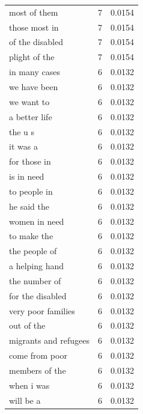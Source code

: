 \begin{tabular}{lrl}
most of them & 7 & 0.0154 \\
those most in & 7 & 0.0154 \\
of the disabled & 7 & 0.0154 \\
plight of the & 7 & 0.0154 \\
in many cases & 6 & 0.0132 \\
we have been & 6 & 0.0132 \\
we want to & 6 & 0.0132 \\
a better life & 6 & 0.0132 \\
the u s & 6 & 0.0132 \\
it was a & 6 & 0.0132 \\
for those in & 6 & 0.0132 \\
is in need & 6 & 0.0132 \\
to people in & 6 & 0.0132 \\
he said the & 6 & 0.0132 \\
women in need & 6 & 0.0132 \\
to make the & 6 & 0.0132 \\
the people of & 6 & 0.0132 \\
a helping hand & 6 & 0.0132 \\
the number of & 6 & 0.0132 \\
for the disabled & 6 & 0.0132 \\
very poor families & 6 & 0.0132 \\
out of the & 6 & 0.0132 \\
migrants and refugees & 6 & 0.0132 \\
come from poor & 6 & 0.0132 \\
members of the & 6 & 0.0132 \\
when i was & 6 & 0.0132 \\
will be a & 6 & 0.0132 \\
\bottomrule
\end{tabular}

